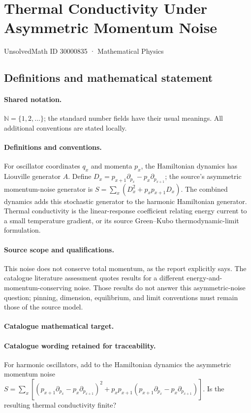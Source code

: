 \documentclass[11pt]{article}
\begin{document}
\setcounter{section}{30000834}
\section{Thermal Conductivity Under Asymmetric Momentum Noise}\label{30000835}
{\small UnsolvedMath ID 30000835 · Mathematical Physics}
\subsection{Definitions and mathematical statement}

\paragraph{Shared notation.}$\mathbb N=\{1,2,\ldots\}$; the standard number fields have their usual meanings. All additional conventions are stated locally.


\paragraph{Definitions and conventions.} For oscillator coordinates $q_x$ and momenta $p_x$, the Hamiltonian dynamics has Liouville generator $A$. Define $D_x=p_{x+1}\partial_{p_x}-p_x\partial_{p_{x+1}}$; the source's asymmetric momentum-noise generator is $S=\sum_x(D_x^2+p_xp_{x+1}D_x)$. The combined dynamics adds this stochastic generator to the harmonic Hamiltonian generator. Thermal conductivity is the linear-response coefficient relating energy current to a small temperature gradient, or its source Green--Kubo thermodynamic-limit formulation.

\paragraph{Source scope and qualifications.} This noise does not conserve total momentum, as the report explicitly says. The catalogue literature assessment quotes results for a different energy-and-momentum-conserving noise. Those results do not answer this asymmetric-noise question; pinning, dimension, equilibrium, and limit conventions must remain those of the source model.

\paragraph{Catalogue mathematical target.}
\paragraph{Catalogue wording retained for traceability.}
For harmonic oscillators, add to the Hamiltonian dynamics the asymmetric momentum noise $S=\sum_x[(p_{x+1}\partial_{p_x}-p_x\partial_{p_{x+1}})^2+p_xp_{x+1}(p_{x+1}\partial_{p_x}-p_x\partial_{p_{x+1}})]$. Is the resulting thermal conductivity finite?
\end{document}
